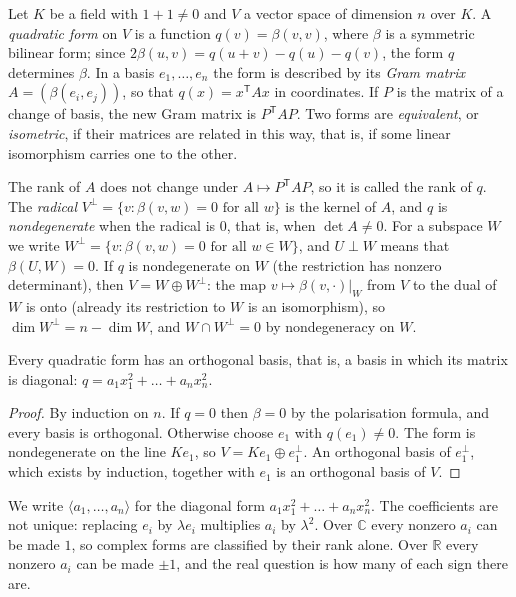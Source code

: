 Let $K$ be a field with $1+1\ne0$ and $V$ a vector space of dimension $n$ over $K$. A \emph{quadratic form} on $V$ is a function $q(v)=\beta(v,v)$,
where $\beta$ is a symmetric bilinear form; since $2\beta(u,v)=q(u+v)-q(u)-q(v)$, the form $q$ determines $\beta$. In a basis $e_1,\dots,e_n$ the
form is described by its \emph{Gram matrix} $A=(\beta(e_i,e_j))$, so that $q(x)=x^{\mathsf T}Ax$ in coordinates. If $P$ is the matrix of a change of
basis, the new Gram matrix is $P^{\mathsf T}AP$. Two forms are \emph{equivalent}, or \emph{isometric}, if their matrices are related in this way,
that is, if some linear isomorphism carries one to the other.

The rank of $A$ does not change under $A\mapsto P^{\mathsf T}AP$, so it is called the rank of $q$. The \emph{radical} $V^\perp=\{v:\beta(v,w)=0\text{ for all }w\}$
is the kernel of $A$, and $q$ is \emph{nondegenerate} when the radical is $0$, that is, when $\det A\ne0$. For a subspace $W$ we write
$W^\perp=\{v:\beta(v,w)=0\text{ for all }w\in W\}$, and $U\perp W$ means that $\beta(U,W)=0$. If $q$ is nondegenerate on $W$ (the restriction has
nonzero determinant), then $V=W\oplus W^\perp$: the map $v\mapsto\beta(v,\cdot)|_W$ from $V$ to the dual of $W$ is onto (already its restriction to
$W$ is an isomorphism), so $\dim W^\perp=n-\dim W$, and $W\cap W^\perp=0$ by nondegeneracy on $W$.

\begin{proposition}\label{geometry:prop:orthbasis}
Every quadratic form has an orthogonal basis, that is, a basis in which its matrix is diagonal: $q=a_1x_1^2+\dots+a_nx_n^2$.
\end{proposition}

\begin{proof}
By induction on $n$. If $q=0$ then $\beta=0$ by the polarisation formula, and every basis is orthogonal. Otherwise choose $e_1$ with $q(e_1)\ne0$.
The form is nondegenerate on the line $Ke_1$, so $V=Ke_1\oplus e_1^\perp$. An orthogonal basis of $e_1^\perp$, which exists by induction, together
with $e_1$ is an orthogonal basis of $V$.
\end{proof}

We write $\langle a_1,\dots,a_n\rangle$ for the diagonal form $a_1x_1^2+\dots+a_nx_n^2$. The coefficients are not unique: replacing $e_i$ by $\lambda
e_i$ multiplies $a_i$ by $\lambda^2$. Over $\mathbb C$ every nonzero $a_i$ can be made $1$, so complex forms are classified by their rank alone. Over
$\mathbb R$ every nonzero $a_i$ can be made $\pm1$, and the real question is how many of each sign there are.

